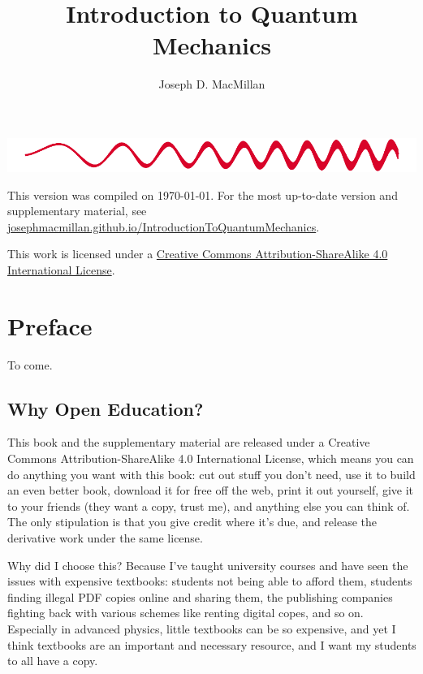 \documentclass[10pt, a5paper, twoside, openany]{memoir}
\title{Introduction to Quantum Mechanics}
\author{Joseph D. MacMillan}
\date{}
\begin{document}
\frontmatter

\maketitle

\begin{center}

\includegraphics[width=\linewidth]{Figures/fig_cover_wave}

\vspace{1in}

{\small

This version was compiled on \today.  For the most up-to-date version and supplementary material, see \href{https://josephmacmillan.github.io/IntroductionToQuantumMechanics/index.html}{josephmacmillan.github.io/IntroductionToQuantumMechanics}.

\vspace{2in}

This work is licensed under a \href{https://creativecommons.org/licenses/by-sa/4.0/}{Creative Commons Attribution-ShareAlike 4.0 International License}.
}
\end{center}


\newpage

\tableofcontents

\chapter{Preface}

To come. 

\section{Why Open Education?}

This book and the supplementary material are released under a Creative Commons Attribution-ShareAlike 4.0 International License, which means you can do anything you want with this book:  cut out stuff you don't need, use it to build an even better book, download it for free off the web, print it out yourself, give it to your friends (they want a copy, trust me), and anything else you can think of.  The only stipulation is that you give credit where it's due, and release the derivative work under the same license.

Why did I choose this?  Because I've taught university courses and have seen the issues with expensive textbooks: students not being able to afford them, students finding illegal PDF copies online and sharing them, the publishing companies fighting back with various schemes like renting digital copes, and so on.  Especially in advanced physics, little textbooks can be so expensive, and yet I think textbooks are an important and necessary resource, and I want my students to all have a copy.
\end{document}
